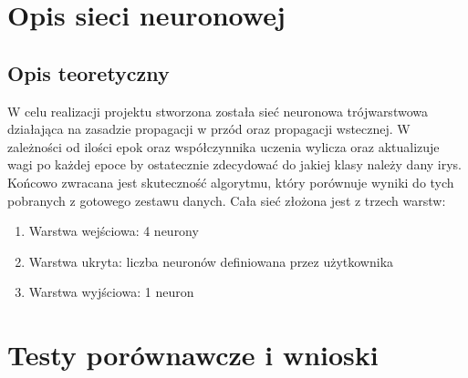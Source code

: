 \documentclass[]{mgr}
\begin{document}
\chapter{Opis sieci neuronowej}


\section{Opis teoretyczny}
W celu realizacji projektu stworzona została sieć neuronowa trójwarstwowa działająca na zasadzie propagacji w przód oraz propagacji wstecznej. W zależności od ilości epok oraz współczynnika uczenia wylicza oraz aktualizuje wagi po każdej epoce by ostatecznie zdecydować do jakiej klasy należy dany irys. Końcowo zwracana jest skuteczność algorytmu, który porównuje wyniki do tych pobranych z gotowego zestawu danych. Cała sieć złożona jest z trzech warstw:
\begin{enumerate}
    \item Warstwa wejściowa: 4 neurony
    \item Warstwa ukryta: liczba neuronów definiowana przez użytkownika
    \item Warstwa wyjściowa: 1 neuron
\end{enumerate}

\chapter{Testy porównawcze i wnioski}
\end{document}
